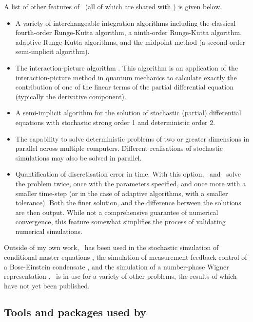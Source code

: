 A list of other features of \xpdeint\ (all of which are shared with \XMDS) is given below.
\begin{itemize}
    \item A variety of interchangeable integration algorithms including the classical fourth-order Runge-Kutta algorithm, a ninth-order Runge-Kutta algorithm, adaptive Runge-Kutta algorithms, and the midpoint method (a second-order semi-implicit algorithm).
    \item The interaction-picture algorithm \citep{Caradoc-Davies:2000qy}.  This algorithm is an application of the interaction-picture method in quantum mechanics to calculate exactly the contribution of one of the linear terms of the partial differential equation (typically the derivative component).
    \item A semi-implicit algorithm for the solution of stochastic (partial) differential equations \citep{Drummond:1991,Werner:1997} with stochastic strong order 1 and deterministic order 2.
    \item The capability to solve deterministic problems of two or greater dimensions in parallel across multiple computers.  Different realisations of stochastic simulations may also be solved in parallel.
    \item Quantification of discretisation error in time.  With this option, \XMDS\ and \xpdeint\ solve the problem twice, once with the parameters specified, and once more with a smaller time-step (or in the case of adaptive algorithms, with a smaller tolerance).  Both the finer solution, and the difference between the solutions are then output.  While not a comprehensive guarantee of numerical convergence, this feature somewhat simplifies the process of validating numerical simulations.
\end{itemize}

\parasep

Outside of my own work, \xpdeint\ has been used in the stochastic simulation of conditional master equations \citep{Hush:2009}, the simulation of measurement feedback control of a Bose-Einstein condensate \citep{Szigeti:2009}, and the simulation of a number-phase Wigner representation \citep{Hush:2010}.  \xpdeint\ is in use for a variety of other problems, the results of which have not yet been published.

\subsection{Tools and packages used by \xpdeint}

